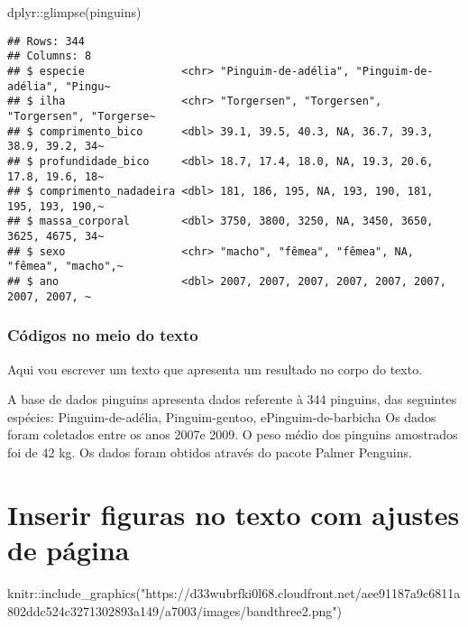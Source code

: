 \documentclass[
]{article}
\newenvironment{Shaded}{\begin{snugshade}}{\end{snugshade}}
\newcommand{\FunctionTok}[1]{\textcolor[rgb]{0.00,0.00,0.00}{#1}}
\newcommand{\NormalTok}[1]{#1}
\newcommand{\SpecialCharTok}[1]{\textcolor[rgb]{0.00,0.00,0.00}{#1}}
\newcommand{\StringTok}[1]{\textcolor[rgb]{0.31,0.60,0.02}{#1}}
\begin{document}
\begin{Shaded}
\begin{Highlighting}[]
\NormalTok{dplyr}\SpecialCharTok{::}\FunctionTok{glimpse}\NormalTok{(pinguins)}
\end{Highlighting}
\end{Shaded}

\begin{verbatim}
## Rows: 344
## Columns: 8
## $ especie               <chr> "Pinguim-de-adélia", "Pinguim-de-adélia", "Pingu~
## $ ilha                  <chr> "Torgersen", "Torgersen", "Torgersen", "Torgerse~
## $ comprimento_bico      <dbl> 39.1, 39.5, 40.3, NA, 36.7, 39.3, 38.9, 39.2, 34~
## $ profundidade_bico     <dbl> 18.7, 17.4, 18.0, NA, 19.3, 20.6, 17.8, 19.6, 18~
## $ comprimento_nadadeira <dbl> 181, 186, 195, NA, 193, 190, 181, 195, 193, 190,~
## $ massa_corporal        <dbl> 3750, 3800, 3250, NA, 3450, 3650, 3625, 4675, 34~
## $ sexo                  <chr> "macho", "fêmea", "fêmea", NA, "fêmea", "macho",~
## $ ano                   <dbl> 2007, 2007, 2007, 2007, 2007, 2007, 2007, 2007, ~
\end{verbatim}

\hypertarget{cuxf3digos-no-meio-do-texto}{%
\subsubsection{Códigos no meio do
texto}\label{cuxf3digos-no-meio-do-texto}}

Aqui vou escrever um texto que apresenta um resultado no corpo do texto.

A base de dados pinguins apresenta dados referente à 344 pinguins, das
seguintes espécies: Pinguim-de-adélia, Pinguim-gentoo,
ePinguim-de-barbicha Os dados foram coletados entre os anos 2007e 2009.
O peso médio dos pinguins amostrados foi de 42 kg. Os dados foram
obtidos através do pacote Palmer Penguins.

\hypertarget{inserir-figuras-no-texto-com-ajustes-de-puxe1gina}{%
\section{Inserir figuras no texto com ajustes de
página}\label{inserir-figuras-no-texto-com-ajustes-de-puxe1gina}}

\begin{Shaded}
\begin{Highlighting}[]
\NormalTok{knitr}\SpecialCharTok{::}\FunctionTok{include\_graphics}\NormalTok{(}\StringTok{"https://d33wubrfki0l68.cloudfront.net/aee91187a9c6811a802ddc524c3271302893a149/a7003/images/bandthree2.png"}\NormalTok{)}
\end{Highlighting}
\end{Shaded}
\end{document}
